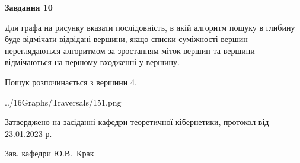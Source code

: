 \documentclass[12pt, ukrainian]{article}
\begin{document}
{\begin {large}
{\begin {center}\textbf{Завдання 10}\end {center}}\par
Для графа на рисунку вказати послідовність, в якій алгоритм пошуку в глибину буде відмічати відвідані вершини, якщо списки суміжності вершин переглядаються алгоритмом за зростанням міток вершин та вершини відмічаються на першому вход\-женні у вершину.\par
Пошук розпочинається з вершини 4.\par

\begin{center}
	{../16Graphs/Traversals/151.png}
\end{center}\par
\newpage


\end {large}
}
{\smallskip \begin {small} Затверджено на засіданні кафедри теоретичної кібернетики, протокол  від   23.01.2023 р.\par\smallskip\smallskip
{\parbox {6.5 cm}{Зав. кафедри \dotfill Ю.В.~Крак}} \end{small}}
\end{document}
